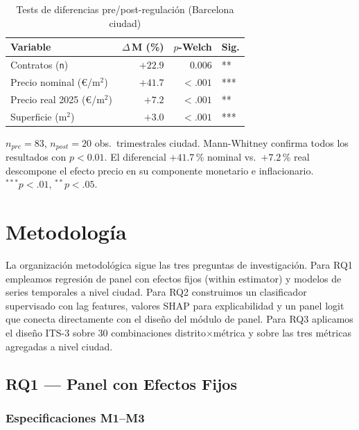 \documentclass[10pt,a4paper,twocolumn]{article}
\begin{document}
\begin{table}[!t]
\caption{Tests de diferencias pre/post-regulación (Barcelona ciudad)}
\label{tab:prepost}
\centering\small
\begin{threeparttable}
\begin{tabular}{lrrl}
\toprule
Variable & $\Delta$\,M (\%) & $p$-Welch & Sig. \\
\midrule
Contratos (\texttt{n})          & $+22.9$ & $0.006$ & ** \\
Precio nominal (\euro/m$^2$)    & $+41.7$ & $<.001$ & *** \\
Precio real 2025 (\euro/m$^2$)  & $+7.2$  & $<.001$ & ** \\
Superficie (m$^2$)              & $+3.0$  & $<.001$ & *** \\
\bottomrule
\end{tabular}
\begin{tablenotes}\small
\item $n_{pre}{=}83$, $n_{post}{=}20$ obs.\ trimestrales ciudad.
Mann-Whitney confirma todos los resultados con $p{<}0.01$.
El diferencial $+41.7$\,\% nominal vs.\ $+7.2$\,\% real descompone el efecto
precio en su componente monetario e inflacionario.
$^{***}p{<}.01$, $^{**}p{<}.05$.
\end{tablenotes}
\end{threeparttable}
\end{table}

\section{Metodología}
\label{sec:metodos}

La organización metodológica sigue las tres preguntas de investigación.
Para RQ1 empleamos regresión de panel con efectos fijos (within estimator) y
modelos de series temporales a nivel ciudad. Para RQ2 construimos un clasificador
supervisado con lag features, valores SHAP para explicabilidad y un panel logit
que conecta directamente con el diseño del módulo de panel. Para RQ3 aplicamos
el diseño ITS-3 sobre 30 combinaciones distrito$\times$métrica y sobre las
tres métricas agregadas a nivel ciudad.

\subsection{RQ1 — Panel con Efectos Fijos}

\subsubsection{Especificaciones M1--M3}
\end{document}
